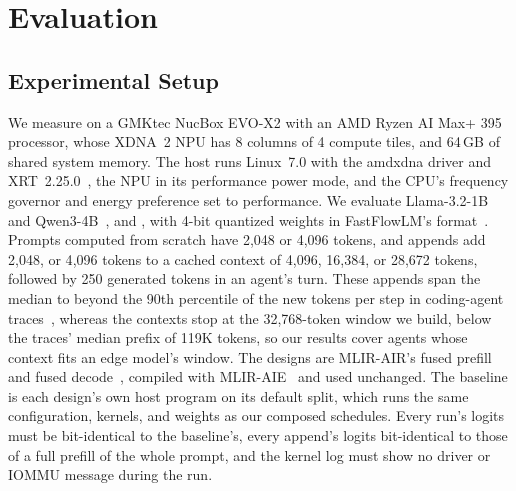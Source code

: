 \section{Evaluation}
\label{sec:eval}

\subsection{Experimental Setup}
\label{subsec:setup}

We measure on a GMKtec NucBox EVO-X2 with an AMD Ryzen\texttrademark{} AI Max+ 395 processor, whose XDNA~2 NPU has 8 columns of 4 compute tiles, and 64\,GB of shared system memory.
The host runs Linux~7.0 with the amdxdna driver and XRT~2.25.0~\citep{xdna-driver,xrt-repo}, the NPU in its performance power mode, and the CPU's frequency governor and energy preference set to performance.
We evaluate Llama-3.2-1B~\citep{meta2024llama32} and Qwen3-4B~\citep{yang2025qwen3}, and , with 4-bit quantized weights in FastFlowLM's format~\citep{fastflowlm-repo}.
Prompts computed from scratch have 2{,}048 or 4{,}096 tokens, and appends add  2{,}048, or 4{,}096 tokens to a cached context of 4{,}096, 16{,}384, or 28{,}672 tokens, followed by 250 generated tokens in an agent's turn.
These appends span the median to beyond the 90th percentile of the new tokens per step in coding-agent traces~\citep{zhu2026tracelab}, whereas the contexts stop at the 32{,}768-token window we build, below the traces' median prefix of 119K tokens, so our results cover agents whose context fits an edge model's window.
The designs are MLIR-AIR's fused prefill and fused decode~\citep{wang2026mlirair}, compiled with MLIR-AIE~\citep{mlir-aie-repo} and used unchanged.
The baseline is each design's own host program on its default split, which runs the same configuration, kernels, and weights as our composed schedules.
Every run's logits must be bit-identical to the baseline's, every append's logits bit-identical to those of a full prefill of the whole prompt, and the kernel log must show no driver or IOMMU message during the run.
